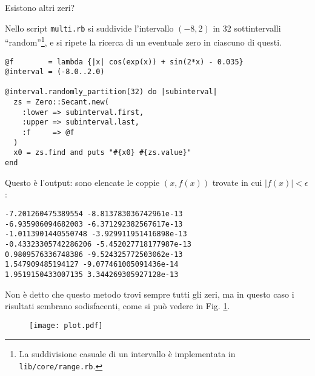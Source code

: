 \documentclass[a4paper]{article}
\begin{document}
Esistono altri zeri?

Nello script \texttt{multi.rb} si suddivide l'intervallo $(-8, 2)$ 
in 32 sottintervalli ``random''\footnote{La suddivisione casuale di un intervallo è implementata in \texttt{lib/core/range.rb}.}, 
e si ripete la ricerca di un eventuale
zero in ciascuno di questi.
\begin{lstlisting}
@f        = lambda {|x| cos(exp(x)) + sin(2*x) - 0.035}
@interval = (-8.0..2.0)

@interval.randomly_partition(32) do |subinterval|
  zs = Zero::Secant.new(
    :lower => subinterval.first,
    :upper => subinterval.last,
    :f     => @f
  )
  x0 = zs.find and puts "#{x0} #{zs.value}"
end
\end{lstlisting}

Questo è l'output: sono elencate le coppie $(x, f(x))$ trovate in cui 
$|f(x)| < \epsilon$:
\begin{lstlisting}
-7.201260475389554 -8.813783036742961e-13
-6.935906094682003 -6.371292382567617e-13
-1.0113901440550748 -3.929911951416898e-13
-0.43323305742286206 -5.452027718177987e-13
0.9809576336748386 -9.524325772503062e-13
1.547909485194127 -9.077461005091436e-14
1.9519150433007135 3.344269305927128e-13
\end{lstlisting}

Non è detto che questo metodo trovi sempre tutti gli zeri, ma in questo
caso i risultati sembrano sodisfacenti, come si può vedere in 
Fig. \ref{fig:plot}.

\begin{center}
  \begin{figure}

    \begin{center}
      \texttt{[image: plot.pdf]}
    \end{center}

    \caption{  }
    
    \label{fig:plot}
    
  \end{figure}
\end{center}
\end{document}
